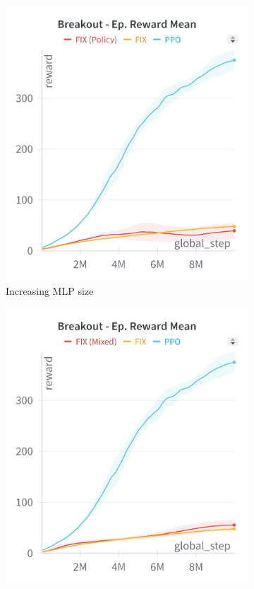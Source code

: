 \begin{figure}[ht]
    \centering
    \begin{subfigure}[b]{0.32\textwidth}
        \centering
        \includegraphics[width=\textwidth]{images/breakout_fix_policy}
        \caption{Increasing MLP size}
        \label{fig:breakout_fix_policy}
    \end{subfigure}
    \hfill
    \begin{subfigure}[b]{0.32\textwidth}
        \centering
        \includegraphics[width=\textwidth]{images/breakout_fix_mixed}

\end{subfigure}
\end{figure}

